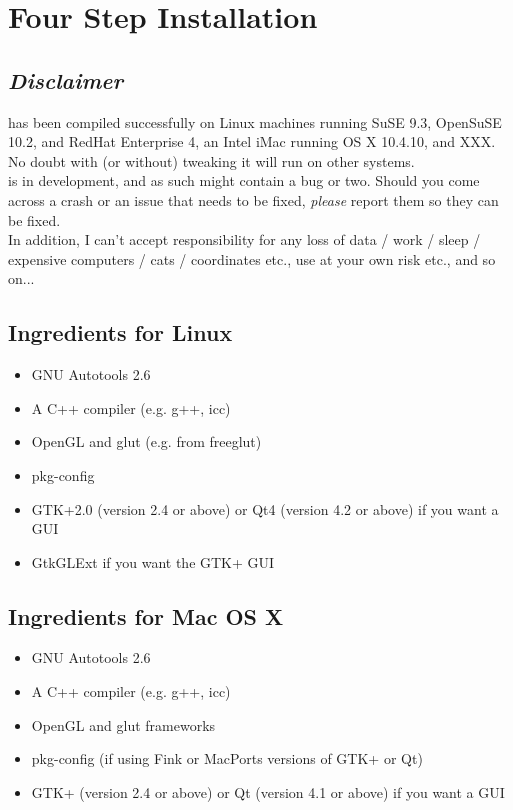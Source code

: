 \chapter{Four Step Installation}
\label{sec:install}

\section{\emph{Disclaimer}}
\label{sec:disclaimer}

\progname{} has been compiled successfully on Linux machines running SuSE 9.3, OpenSuSE 10.2, and RedHat Enterprise 4, an Intel iMac running OS X 10.4.10, and XXX. No doubt with (or without) tweaking it will run on other systems.\\

\progname{} is in development, and as such might contain a bug or two. Should you come across a crash or an issue that needs to be fixed, \emph{please} report them so they can be fixed.\\

In addition, I can't accept responsibility for any loss of data / work / sleep / expensive computers / cats / coordinates etc., use at your own risk etc., and so on...\\

\section{Ingredients for Linux}
\label{sec:linuxinstall}
\begin{itemize}
	\item GNU Autotools 2.6
	\item A C++ compiler (e.g. g++, icc)
	\item OpenGL and glut (e.g. from freeglut)
	\item pkg-config
	\item GTK+2.0 (version 2.4 or above) or Qt4 (version 4.2 or above) if you want a GUI
	\item GtkGLExt if you want the GTK+ GUI
\end{itemize}

\section{Ingredients for Mac OS X}
\label{sec:macinstall}
\begin{itemize}
	\item GNU Autotools 2.6
	\item A C++ compiler (e.g. g++, icc)
	\item OpenGL and glut frameworks
	\item pkg-config (if using Fink or MacPorts versions of GTK+ or Qt)
	\item GTK+ (version 2.4 or above) or Qt (version 4.1 or above) if you want a GUI
\end{itemize}

